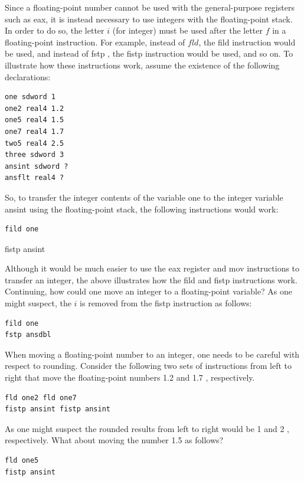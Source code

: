 \documentclass[10pt]{book}
\begin{document}
Since a floating-point number cannot be used with the general-purpose registers such as eax, it is instead necessary to use integers with the floating-point stack. In order to do so, the letter $i$ (for integer) must be used after the letter $f$ in a floating-point instruction. For example, instead of $f l d$, the fild instruction would be used, and instead of fstp , the fistp instruction would be used, and so on. To illustrate how these instructions work, assume the existence of the following declarations:

\begin{verbatim}
one sdword 1
one2 real4 1.2
one5 real4 1.5
one7 real4 1.7
two5 real4 2.5
three sdword 3
ansint sdword ?
ansflt real4 ?
\end{verbatim}

So, to transfer the integer contents of the variable one to the integer variable ansint using the floating-point stack, the following instructions would work:

\begin{verbatim}
fild one
\end{verbatim}

fistp ansint

Although it would be much easier to use the eax register and mov instructions to transfer an integer, the above illustrates how the fild and fistp instructions work. Continuing, how could one move an integer to a floating-point variable? As one might suspect, the $i$ is removed from the fistp instruction as follows:

\begin{verbatim}
fild one
fstp ansdbl
\end{verbatim}

When moving a floating-point number to an integer, one needs to be careful with respect to rounding. Consider the following two sets of instructions from left to right that move the floating-point numbers 1.2 and 1.7 , respectively.


\begin{verbatim}
fld one2 fld one7
fistp ansint fistp ansint
\end{verbatim}

As one might suspect the rounded results from left to right would be 1 and 2 , respectively. What about moving the number 1.5 as follows?

\begin{verbatim}
fld one5
fistp ansint
\end{verbatim}
\end{document}
